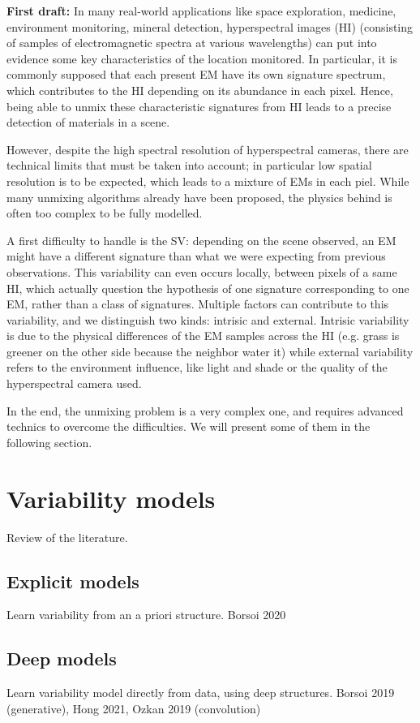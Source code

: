 \documentclass[conference]{IEEEtran}
\begin{document}
\textbf{First draft:} In many real-world applications like space exploration, medicine, environment monitoring, mineral detection, hyperspectral images (HI) (consisting of samples of electromagnetic spectra at various wavelengths) can put into evidence some key characteristics of the location monitored. In particular, it is commonly supposed that each present EM have its own signature spectrum, which contributes to the HI depending on its abundance in each pixel. Hence, being able to unmix these characteristic signatures from HI leads to a precise detection of materials in a scene.

However, despite the high spectral resolution of hyperspectral cameras, there are technical limits that must be taken into account; in particular low spatial resolution is to be expected, which leads to a mixture of EMs in each piel. While many unmixing algorithms already have been proposed, the physics behind is often too complex to be fully modelled.

A first difficulty to handle is the SV: depending on the scene observed, an EM might have a different signature than what we were expecting from previous observations. This variability can even occurs locally, between pixels of a same HI, which actually question the hypothesis of one signature corresponding to one EM, rather than a class of signatures. Multiple factors can contribute to this variability, and we distinguish two kinds: intrisic and external. Intrisic variability is due to the physical differences of the EM samples across the HI (e.g. grass is greener on the other side because the neighbor water it) while external variability refers to the environment influence, like light and shade or the quality of the hyperspectral camera used.

In the end, the unmixing problem is a very complex one, and requires advanced technics to overcome the difficulties. We will present some of them in the following section.

\section{Variability models}
Review of the literature.

\subsection{Explicit models}
Learn variability from an a priori structure. Borsoi 2020

\subsection{Deep models}
Learn variability model directly from data, using deep structures. Borsoi 2019 (generative), Hong 2021, Ozkan 2019 (convolution)
\end{document}
